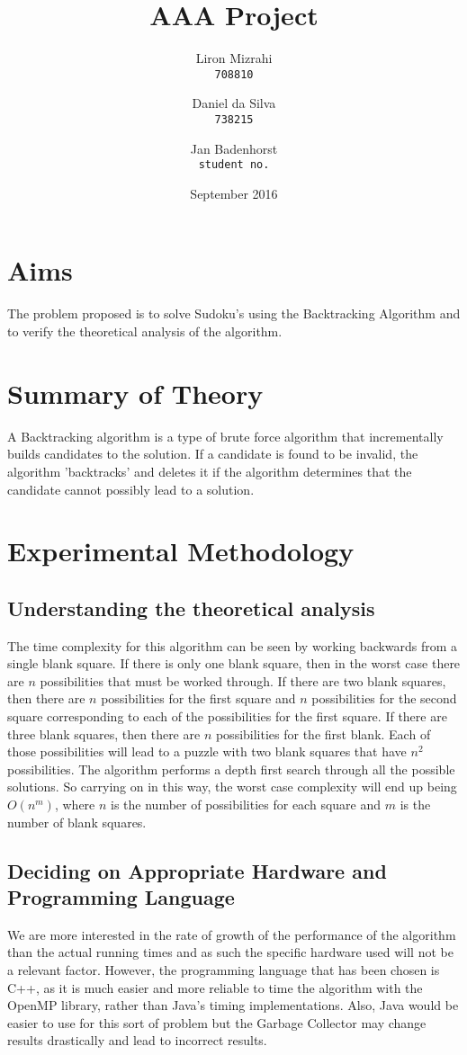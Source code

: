 \documentclass{article}
\title{AAA Project}
\date{September 2016}
\author{
  Liron Mizrahi\\
  \texttt{708810}
  \and
  Daniel da Silva\\
  \texttt{738215}
  \and
  Jan Badenhorst\\
  \texttt{student no.}
}
\begin{document}
\maketitle

\section{Aims}
The problem proposed is to solve Sudoku's using the Backtracking Algorithm and to verify the theoretical analysis of the algorithm.

\section{Summary of Theory}
A Backtracking algorithm is a type of brute force algorithm that incrementally builds candidates to the solution. If a candidate is found to be invalid, the algorithm 'backtracks' and deletes it if the algorithm determines that the candidate cannot possibly lead to a solution.

\section{Experimental Methodology}
\subsection{Understanding the theoretical analysis}
The time complexity for this algorithm can be seen by working backwards from a single blank square. If there is only one blank square, then in the worst case there are $n$ possibilities that must be worked through. If there are two blank squares, then there are $n$ possibilities for the first square and $n$ possibilities for the second square corresponding to each of the possibilities for the first square. If there are three blank squares, then there are $n$ possibilities for the first blank. Each of those possibilities will lead to a puzzle with two blank squares that have $n^2$ possibilities.
The algorithm performs a depth first search through all the possible solutions. So carrying on in this way, the worst case complexity will end up being $O(n^m)$, where $n$ is the number of possibilities for each square and $m$ is the number of blank squares.

\subsection{Deciding on Appropriate Hardware and Programming Language}
We are more interested in the rate of growth of the performance of the algorithm than the actual running times and as such the specific hardware used will not be a relevant factor. However, the programming language that has been chosen is C++, as it is much easier and more reliable to time the algorithm with the OpenMP library, rather than Java's timing implementations. Also, Java would be easier to use for this sort of problem but the Garbage Collector may change results drastically and lead to incorrect results.
\end{document}

